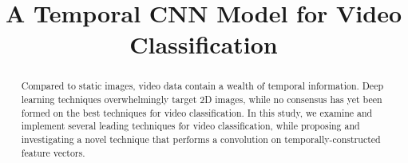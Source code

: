 \documentclass[conference,10pt]{IEEEtran}
\begin{document}
\title{A Temporal CNN Model for Video Classification}
\author{
}
\maketitle
\begin{abstract}
Compared to static images, video data contain a wealth of temporal information.
Deep learning techniques overwhelmingly target 2D images, while no consensus has yet been formed on the best techniques for video classification. In this study, we examine and implement several leading techniques for video classification, while proposing and investigating a novel technique that performs a convolution on temporally-constructed feature vectors.
\end{abstract}



\end{document}
